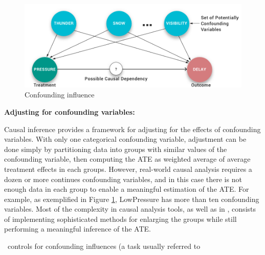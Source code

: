 {
\begin{figure}
\hspace*{.3cm}\includegraphics[scale=0.2]{figures/Scenario-Graph.png}
\caption{Confounding influence}

\label{fig:cv}
\vspace{-0.3cm}
\end{figure}}
 {\bf Adjusting for confounding variables:} {
Causal inference provides a framework for adjusting for the effects of
confounding variables.
 With only one categorical confounding variable, adjustment can be
 done simply by partitioning data into
 groups with similar values of the confounding variable, then
 computing the ATE as  weighted average of average treatment effects in each groups. However, real-world causal analysis requires a dozen or more continues confounding variables, and in this case there is not enough data in each group to enable a meaningful estimation of the ATE. For example, as exemplified in Figure \ref{fig:cv}, LowPressure has more than ten confounding variables.  Most of the complexity in causal analysis tools, as well as in \GSQL, consists of implementing sophisticated methods for enlarging the groups while still performing a meaningful inference of the ATE.
}\GSQL\ controls for confounding influences (a task usually referred to
